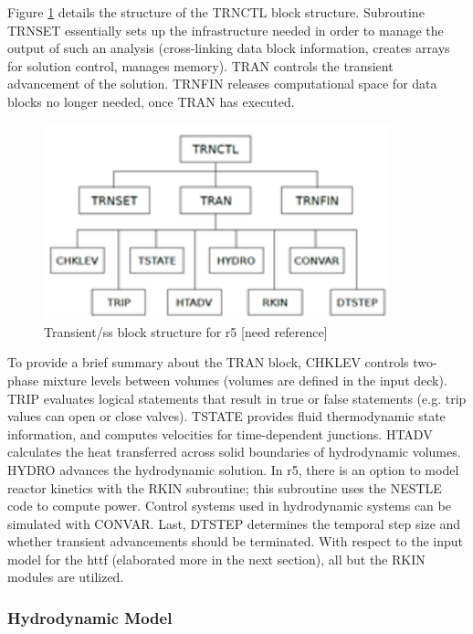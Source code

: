\documentclass[double,12pt]{beavtex}
\begin{document}
Figure \ref{fig:RELAP_Block_Structure} details the structure of the TRNCTL block structure. Subroutine TRNSET essentially sets up the infrastructure needed in order to manage the output of such an analysis (cross-linking data block information, creates arrays for solution control, manages memory). TRAN controls the transient advancement of the solution. TRNFIN releases computational space for data blocks no longer needed, once TRAN has executed.

\begin{figure}
    \begin{center}
    	\includegraphics[width=10cm]{Figures/RELAP_Block_Structure.png}
    	\caption{Transient/\acrshort{ss} block structure for \acrshort{r5}  [need reference]}
    	\label{fig:RELAP_Block_Structure}
    	\end{center}
\end{figure}

To provide a brief summary about the TRAN block, CHKLEV controls two-phase mixture levels between volumes (volumes are defined in the input deck). TRIP evaluates logical statements that result in true or false statements (e.g. trip values can open or close valves). TSTATE provides fluid thermodynamic state information, and computes velocities for time-dependent junctions. HTADV calculates the heat transferred across solid boundaries of hydrodynamic volumes. HYDRO advances the hydrodynamic solution. In \acrshort{r5}, there is an option to model reactor kinetics with the RKIN subroutine; this subroutine uses the NESTLE code to compute power. Control systems used in hydrodynamic systems can be simulated with CONVAR. Last, DTSTEP determines the temporal step size and whether transient advancements should be terminated. With respect to the input model for the \acrshort{httf} (elaborated more in the next section), all but the RKIN modules are utilized.

\subsubsection{Hydrodynamic Model}
\end{document}
